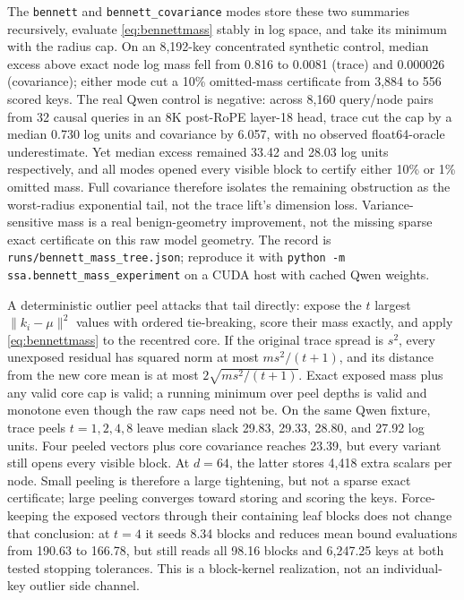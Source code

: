 \documentclass[11pt]{article}
\numberwithin{equation}{section}
\begin{document}
The \texttt{bennett} and \texttt{bennett\_covariance} modes store these two summaries recursively, evaluate
\eqref{eq:bennettmass} stably in log space, and take its minimum with the radius cap. On an 8,192-key
concentrated synthetic control, median excess above exact node log mass fell from 0.816 to 0.0081 (trace) and
0.000026 (covariance); either mode cut a 10\% omitted-mass certificate from 3,884 to 556 scored keys. The real
Qwen control is negative: across 8,160 query/node pairs from 32 causal queries in an 8K post-RoPE layer-18
head, trace cut the cap by a median 0.730 log units and covariance by 6.057, with no observed float64-oracle
underestimate. Yet median excess remained 33.42 and 28.03 log units respectively, and all modes opened every
visible block to certify either 10\% or 1\% omitted mass. Full covariance therefore isolates the remaining
obstruction as the worst-radius exponential tail, not the trace lift's dimension loss. Variance-sensitive mass
is a real benign-geometry improvement, not the missing sparse exact certificate on this raw model geometry.
The record is \texttt{runs/bennett\_mass\_tree.json}; reproduce it with
\texttt{python -m ssa.bennett\_mass\_experiment} on a CUDA host with cached Qwen weights.

A deterministic outlier peel attacks that tail directly: expose the $t$ largest
$\lVert k_i-\mu\rVert^2$ values with ordered tie-breaking, score their mass exactly, and apply
\eqref{eq:bennettmass} to the recentred core. If the original trace spread is $s^2$, every unexposed residual
has squared norm at most $ms^2/(t+1)$, and its distance from the new core mean is at most
$2\sqrt{ms^2/(t+1)}$. Exact exposed mass plus any valid core cap is valid; a running minimum over peel depths
is valid and monotone even though the raw caps need not be. On the same Qwen fixture, trace peels
$t=1,2,4,8$ leave median slack 29.83, 29.33, 28.80, and 27.92 log units. Four peeled vectors plus core
covariance reaches 23.39, but every variant still opens every visible block. At $d=64$, the latter stores
4,418 extra scalars per node. Small peeling is therefore a large tightening, but not a sparse exact
certificate; large peeling converges toward storing and scoring the keys.
Force-keeping the exposed vectors through their containing leaf blocks does not change that conclusion: at
$t=4$ it seeds 8.34 blocks and reduces mean bound evaluations from 190.63 to 166.78, but still reads all 98.16
blocks and 6,247.25 keys at both tested stopping tolerances. This is a block-kernel realization, not an
individual-key outlier side channel.
\end{document}
